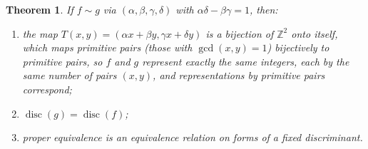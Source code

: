 \documentclass[11pt]{article}
\theoremstyle{ntstyle}
\newtheorem{theorem}{Theorem}[subsection]
\DeclareMathOperator{\disc}{disc}
\begin{document}
\begin{theorem}\label{thm:8.6.1} If $f\sim g$ via
	$(\alpha,\beta,\gamma,\delta)$ with
	$\alpha\delta-\beta\gamma=1$, then:
	\begin{enumerate}[label={\alph*)}]
		\item the map $T(x,y)=(\alpha x+\beta y,\gamma x+\delta y)$ is a
					bijection of $\mathbb{Z}^2$ onto itself, which maps primitive
					pairs (those with $\gcd(x, y)=1$) bijectively to primitive pairs, so $f$ and
					$g$ represent exactly the same integers, each by the same number of pairs $(x,y)$, and
					representations by primitive pairs correspond;
		\item $\disc(g)=\disc(f)$;
		\item proper equivalence is an equivalence relation on forms of a
					fixed discriminant.
	\end{enumerate}
\end{theorem}
\end{document}
